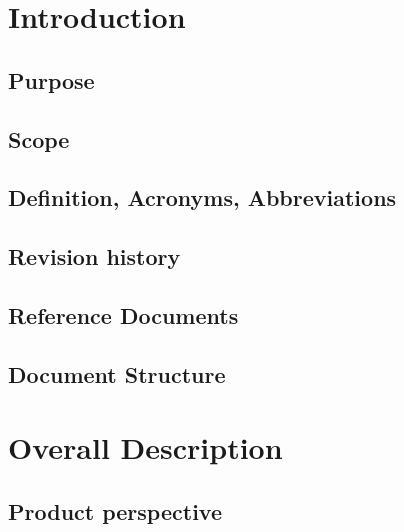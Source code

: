 \documentclass{Configuration_Files/PoliMi3i_thesis}
\begin{document}
    \mainmatter %


    \chapter{Introduction}\label{ch:introduction}
    


    \section{Purpose}\label{sec:purpose}


    \section{Scope}\label{sec:scope}


    \section{Definition, Acronyms, Abbreviations}\label{sec:definition_acronyms_abbreviations}


    \section{Revision history}\label{sec:revision_history}


    \section{Reference Documents}\label{sec:reference_documents}


    \section{Document Structure}\label{sec:document_structure}


    \chapter{Overall Description}\label{ch:overall_description}


    \section{Product perspective}\label{sec:product_perspective}
\end{document}
